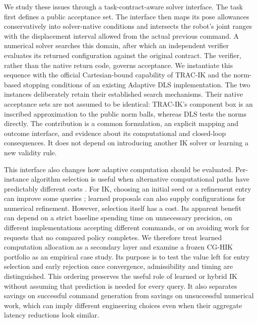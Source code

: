 \documentclass[10pt,a4paper]{article}
\begin{document}
We study these issues through a task-contract-aware solver interface. The task
first defines a public acceptance set. The interface then maps its pose
allowances conservatively into solver-native conditions and intersects the
robot's joint ranges with the displacement interval allowed from the actual
previous command. A numerical solver searches this domain, after which an
independent verifier evaluates its returned configuration against the original
contract. The verifier, rather than the native return code, governs acceptance.
We instantiate this sequence with the official Cartesian-bound capability of
TRAC-IK and the norm-based stopping conditions of an existing Adaptive DLS
implementation. The two instances deliberately retain their established search
mechanisms. Their native acceptance sets are not assumed to be identical:
TRAC-IK's component box is an inscribed approximation to the public norm balls,
whereas DLS tests the norms directly. The contribution is a common formulation,
an explicit mapping and outcome interface, and evidence about its computational
and closed-loop consequences. It does not depend on introducing another IK
solver or learning a new validity rule.

This interface also changes how adaptive computation should be evaluated.
Per-instance algorithm selection is useful when alternative computational paths
have predictably different costs \cite{rice1976selection,bischl2016aslib}.
For IK, choosing an initial seed or a refinement entry can improve some queries
\cite{yuan2025iksel}; learned proposals can also supply configurations for numerical
refinement. However, selection itself has a cost. Its apparent benefit can depend
on a strict baseline spending time on unnecessary precision, on different
implementations accepting different commands, or on avoiding work for requests
that no compared policy completes. We therefore treat learned computation
allocation as a secondary layer and examine a frozen CG-HIK portfolio as an
empirical case study. Its purpose is to test the value left for entry selection
and early rejection once convergence, admissibility and timing are distinguished.
This ordering preserves the useful role of learned or hybrid IK without assuming
that prediction is needed for every query. It also separates savings on successful
command generation from savings on unsuccessful numerical work, which can imply
different engineering choices even when their aggregate latency reductions look
similar.
\end{document}
